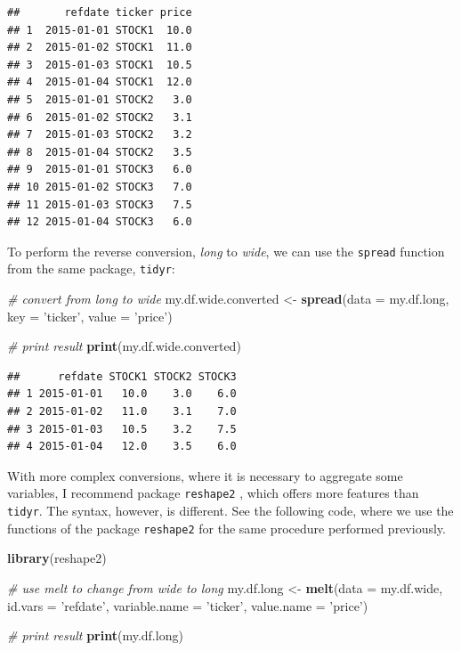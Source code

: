 \documentclass[11pt,]{book}
\newenvironment{Shaded}{\begin{snugshade}}{\end{snugshade}}
\newcommand{\KeywordTok}[1]{\textcolor[rgb]{0.27,0.27,0.27}{\textbf{#1}}}
\newcommand{\DataTypeTok}[1]{\textcolor[rgb]{0.27,0.27,0.27}{#1}}
\newcommand{\StringTok}[1]{\textcolor[rgb]{0.5,0.5,0.5}{#1}}
\newcommand{\CommentTok}[1]{\textcolor[rgb]{0.56,0.35,0.01}{\textit{#1}}}
\newcommand{\NormalTok}[1]{#1}
\begin{document}
\begin{verbatim}
##       refdate ticker price
## 1  2015-01-01 STOCK1  10.0
## 2  2015-01-02 STOCK1  11.0
## 3  2015-01-03 STOCK1  10.5
## 4  2015-01-04 STOCK1  12.0
## 5  2015-01-01 STOCK2   3.0
## 6  2015-01-02 STOCK2   3.1
## 7  2015-01-03 STOCK2   3.2
## 8  2015-01-04 STOCK2   3.5
## 9  2015-01-01 STOCK3   6.0
## 10 2015-01-02 STOCK3   7.0
## 11 2015-01-03 STOCK3   7.5
## 12 2015-01-04 STOCK3   6.0
\end{verbatim}

To perform the reverse conversion, \emph{long} to \emph{wide}, we can
use the \texttt{spread} function from the same package, \texttt{tidyr}:

\begin{Shaded}
\begin{Highlighting}[]
\CommentTok{# convert from long to wide}
\NormalTok{my.df.wide.converted <-}\StringTok{ }\KeywordTok{spread}\NormalTok{(}\DataTypeTok{data =}\NormalTok{ my.df.long, }
                               \DataTypeTok{key =} \StringTok{'ticker'}\NormalTok{,}
                               \DataTypeTok{value =} \StringTok{'price'}\NormalTok{)}

\CommentTok{# print result}
\KeywordTok{print}\NormalTok{(my.df.wide.converted)}
\end{Highlighting}
\end{Shaded}

\begin{verbatim}
##      refdate STOCK1 STOCK2 STOCK3
## 1 2015-01-01   10.0    3.0    6.0
## 2 2015-01-02   11.0    3.1    7.0
## 3 2015-01-03   10.5    3.2    7.5
## 4 2015-01-04   12.0    3.5    6.0
\end{verbatim}

With more complex conversions, where it is necessary to aggregate some
variables, I recommend package \texttt{reshape2}
\citep{wickham2007reshape2}, which offers more features than
\texttt{tidyr}. The syntax, however, is different. See the following
code, where we use the functions of the package \texttt{reshape2} for
the same procedure performed previously. 
 

\begin{Shaded}
\begin{Highlighting}[]
\KeywordTok{library}\NormalTok{(reshape2)}

\CommentTok{# use melt to change from wide to long}
\NormalTok{my.df.long <-}\StringTok{ }\KeywordTok{melt}\NormalTok{(}\DataTypeTok{data =}\NormalTok{ my.df.wide, }
                   \DataTypeTok{id.vars =} \StringTok{'refdate'}\NormalTok{, }
                   \DataTypeTok{variable.name =} \StringTok{'ticker'}\NormalTok{, }
                   \DataTypeTok{value.name =} \StringTok{'price'}\NormalTok{)}

\CommentTok{# print result                 }
\KeywordTok{print}\NormalTok{(my.df.long)}
\end{Highlighting}
\end{Shaded}
\end{document}
